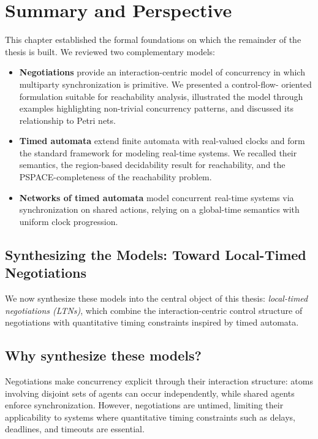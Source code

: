 \section{Summary and Perspective}
\label{sec:summary}

This chapter established the formal foundations on which the remainder of the thesis
is built. We reviewed two complementary models:

\begin{itemize}
\item \textbf{Negotiations} provide an interaction-centric model of concurrency in
      which multiparty synchronization is primitive. We presented a control-flow-
      oriented formulation suitable for reachability analysis, illustrated the model
      through examples highlighting non-trivial concurrency patterns, and discussed
      its relationship to Petri nets.

\item \textbf{Timed automata} extend finite automata with real-valued clocks and form
      the standard framework for modeling real-time systems. We recalled their
      semantics, the region-based decidability result for reachability, and the
      PSPACE-completeness of the reachability problem.

\item \textbf{Networks of timed automata} model concurrent real-time systems via
      synchronization on shared actions, relying on a global-time semantics with
      uniform clock progression.
\end{itemize}

\subsection{Synthesizing the Models: Toward Local-Timed Negotiations}

We now synthesize these models into the central object of this thesis:
\emph{local-timed negotiations (LTNs)}, which combine the interaction-centric control
structure of negotiations with quantitative timing constraints inspired by timed
automata.

\subsection{Why synthesize these models?}

Negotiations make concurrency explicit through their interaction structure: atoms
involving disjoint sets of agents can occur independently, while shared agents enforce
synchronization. However, negotiations are untimed, limiting their applicability to
systems where quantitative timing constraints such as delays, deadlines, and timeouts
are essential.

